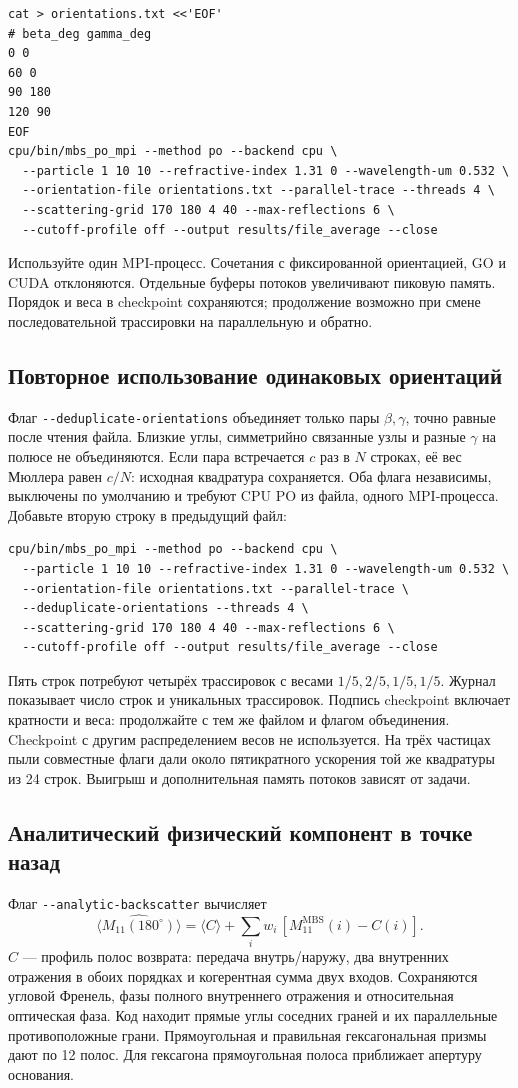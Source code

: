 \documentclass[11pt,a4paper]{article}
\newcommand{\code}[1]{\texttt{\small\detokenize{#1}}}
\newcommand{\flag}[1]{{\small\nolinkurl{#1}}}
\begin{document}
\begin{verbatim}
cat > orientations.txt <<'EOF'
# beta_deg gamma_deg
0 0
60 0
90 180
120 90
EOF
cpu/bin/mbs_po_mpi --method po --backend cpu \
  --particle 1 10 10 --refractive-index 1.31 0 --wavelength-um 0.532 \
  --orientation-file orientations.txt --parallel-trace --threads 4 \
  --scattering-grid 170 180 4 40 --max-reflections 6 \
  --cutoff-profile off --output results/file_average --close
\end{verbatim}

Используйте один MPI-процесс. Сочетания с фиксированной ориентацией, GO и CUDA
отклоняются. Отдельные буферы потоков увеличивают пиковую память.
Порядок и веса в checkpoint сохраняются; продолжение возможно при смене
последовательной трассировки на параллельную и обратно.

\subsection{Повторное использование одинаковых ориентаций}
Флаг \flag{--deduplicate-orientations} объединяет только пары $\beta,\gamma$,
точно равные после чтения файла. Близкие углы, симметрийно связанные узлы и
разные $\gamma$ на полюсе не объединяются. Если пара встречается $c$ раз
в $N$ строках, её вес Мюллера равен $c/N$: исходная квадратура сохраняется.
Оба флага независимы, выключены по умолчанию и требуют CPU PO из файла,
одного MPI-процесса. Добавьте вторую строку \code{60 0} в предыдущий файл:

\begin{verbatim}
cpu/bin/mbs_po_mpi --method po --backend cpu \
  --particle 1 10 10 --refractive-index 1.31 0 --wavelength-um 0.532 \
  --orientation-file orientations.txt --parallel-trace \
  --deduplicate-orientations --threads 4 \
  --scattering-grid 170 180 4 40 --max-reflections 6 \
  --cutoff-profile off --output results/file_average --close
\end{verbatim}

Пять строк потребуют четырёх трассировок с весами $1/5,2/5,1/5,1/5$.
Журнал показывает число строк и уникальных трассировок. Подпись checkpoint
включает кратности и веса: продолжайте с тем же файлом и флагом объединения.
Checkpoint с другим распределением весов не используется. На трёх частицах
пыли совместные флаги дали около пятикратного ускорения той же квадратуры
из 24 строк. Выигрыш и дополнительная память потоков зависят от задачи.

\subsection{Аналитический физический компонент в точке назад}
Флаг \flag{--analytic-backscatter} вычисляет
\[
 \widehat{\langle M_{11}(180^\circ)\rangle}
 =\langle C\rangle+\sum_i w_i\,[M_{11}^{\mathrm{MBS}}(i)-C(i)].
\]
$C$ --- профиль полос возврата: передача внутрь/наружу, два внутренних
отражения в обоих порядках и когерентная сумма двух входов. Сохраняются угловой
Френель, фазы полного внутреннего отражения и относительная оптическая фаза.
Код находит прямые углы соседних граней и их параллельные противоположные
грани. Прямоугольная и правильная гексагональная призмы дают по 12 полос.
Для гексагона прямоугольная полоса приближает апертуру основания.
\end{document}
